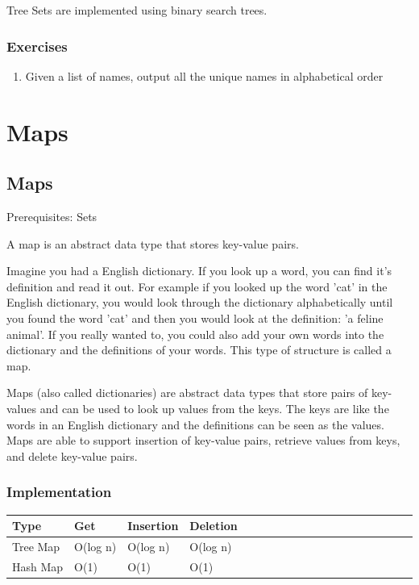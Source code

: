 \documentclass[11pt,oneside]{book}
\begin{document}
Tree Sets are implemented using binary search trees.

\subsection{Exercises}

\begin{enumerate}
\item Given a list of names, output all the unique names in alphabetical order
\end{enumerate}

    \chapter{ Maps }
        \section{ Maps }
        

Prerequisites: Sets

A map is an abstract data type that stores key-value pairs.

Imagine you had a English dictionary. If you look up a word, you can find it's definition and read it out. For example if you looked up the word 'cat' in the English dictionary, you would look through the dictionary alphabetically until you found the word 'cat' and then you would look at the definition: 'a feline animal'. If you really wanted to, you could also add your own words into the dictionary and the definitions of your words. This type of structure is called a map.

Maps (also called dictionaries) are abstract data types that store pairs of key-values and can be used to look up values from the keys. The keys are like the words in an English dictionary and the definitions can be seen as the values. Maps are able to support insertion of key-value pairs, retrieve values from keys, and delete key-value pairs.

\subsection{Implementation}

\vspace{10pt} \begin{tabulary}{0.4\linewidth}{|l|l|l|l|l|l|l|l|l|l|l|l|l|l|l|l|l|l|l}\hline


  Type &
  Get &
  Insertion &
  Deletion\\
\hline


  Tree Map &
  O(log n) &
  O(log n) &
  O(log n)\\

  Hash Map &
  O(1) &
  O(1) &
  O(1)\\

\hline\end{tabulary}
\end{document}
